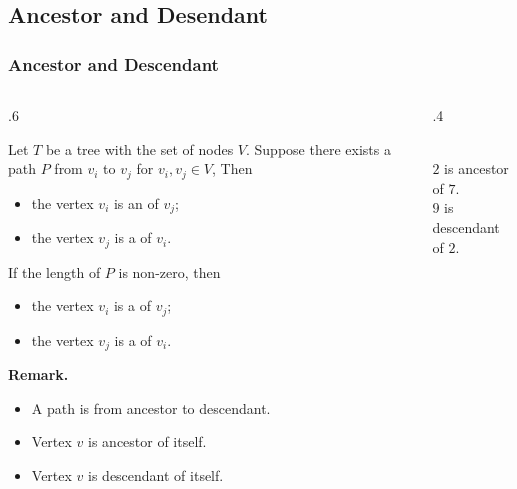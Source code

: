 \documentclass[10pt]{beamer}
\begin{document}
\subsection{Ancestor and Desendant}
\begin{frame}[t]\frametitle{Ancestor and Descendant}
	\begin{columns}[T] %
	\begin{column}{.6\linewidth} %
	{\footnotesize 
		\begin{definition}
			Let $T$  be a tree with the set of nodes $V$.
			Suppose there exists a path $P$ from $v_{i}$ to $v_{j}$ for  $v_{i}, v_{j} \in V$,
			Then
			\begin{itemize}
				\item
				the vertex $v_{i}$ is an   of $v_{j}$;

				\item
				the vertex $v_{j}$ is a   of $v_{i}$.
			\end{itemize}
			
			If the length of $P$ is non-zero, then
			\begin{itemize}
				\item
				the vertex $v_{i}$ is a   of $v_{j}$;

				\item
				the vertex $v_{j}$ is a   of $v_{i}$.
			\end{itemize}
		\end{definition}	

		\textbf{Remark.}
		\begin{itemize}
			
			\item 
			A path is from ancestor to descendant.
			
			\item 
			Vertex $v$ is ancestor of itself.\\
			
			\item 
			Vertex $v$ is descendant of itself.\\
		
		\end{itemize}
	} %
	\end{column} %
	\begin{column}{.4\linewidth} %
		\begin{example}
		{\scriptsize
			
			\\
			$2$ is ancestor of $7$.\\
			$9$ is descendant of $2$.\\
		} %
		\end{example}
	\end{column} %
	\end{columns} %
\end{frame}
\end{document}

